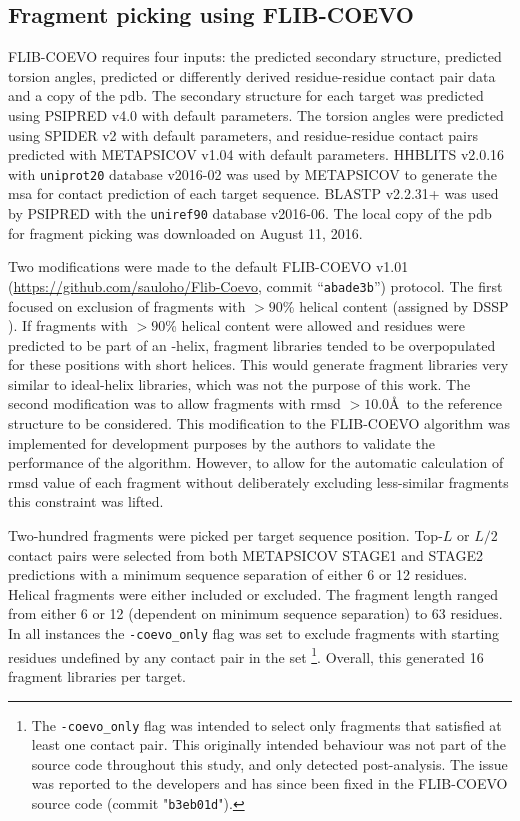 \subsection{Fragment picking using FLIB-COEVO}
FLIB-COEVO \cite{De_Oliveira2018-za} requires four inputs: the predicted secondary structure, predicted torsion angles, predicted or differently derived residue-residue contact pair data and a copy of the \gls{pdb}. The secondary structure for each target was predicted using PSIPRED v4.0 \cite{Jones1999-ed} with default parameters. The torsion angles were predicted using SPIDER v2 \cite{Heffernan2015-bt} with default parameters, and residue-residue contact pairs predicted with METAPSICOV v1.04 \cite{Jones2015-vq} with default parameters. HHBLITS v2.0.16 \cite{Remmert2011-kt} with \texttt{uniprot20} database v2016-02 was used by METAPSICOV to generate the \gls{msa} for contact prediction of each target sequence. BLASTP v2.2.31+ \cite{Altschul1990-og,Camacho2009-th} was used by PSIPRED with the \texttt{uniref90} database v2016-06. The local copy of the \gls{pdb} for fragment picking was downloaded on August 11, 2016.

Two modifications were made to the default FLIB-COEVO v1.01 (\url{https://github.com/sauloho/Flib-Coevo}, commit “\texttt{abade3b}”) protocol. The first focused on exclusion of fragments with $>90$\% helical content (assigned by DSSP \cite{Frishman1995-si}). If fragments with $>90$\% helical content were allowed and residues were predicted to be part of an \textalpha-helix, fragment libraries tended to be overpopulated for these positions with short helices. This would generate fragment libraries very similar to ideal-helix libraries, which was not the purpose of this work. The second modification was to allow fragments with \gls{rmsd} $>10.0$\AA\ to the reference structure to be considered. This modification to the FLIB-COEVO algorithm was implemented for development purposes by the authors to validate the performance of the algorithm. However, to allow for the automatic calculation of \gls{rmsd} value of each fragment without deliberately excluding less-similar fragments this constraint was lifted.

Two-hundred fragments were picked per target sequence position. Top-$L$ or $L/2$ contact pairs were selected from both METAPSICOV STAGE1 and STAGE2 predictions with a minimum sequence separation of either 6 or 12 residues. Helical fragments were either included or excluded. The fragment length ranged from either 6 or 12 (dependent on minimum sequence separation) to 63 residues. In all instances the \texttt{-coevo\_only} flag was set to exclude fragments with starting residues undefined by any contact pair in the set \footnote{The \texttt{-coevo\_only} flag was intended to select only fragments that satisfied at least one contact pair. This originally intended behaviour was not part of the source code throughout this study, and only detected post-analysis. The issue was reported to the developers and has since been fixed in the FLIB-COEVO source code (commit "\texttt{b3eb01d}").}. Overall, this generated 16 fragment libraries per target.

